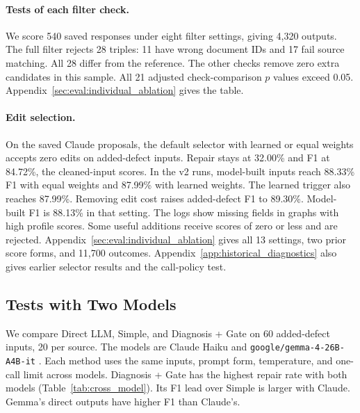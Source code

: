 \paragraph{Tests of each filter check.}
We score 540 saved responses under eight filter settings, giving 4,320
outputs. The full filter rejects 28 triples: 11 have wrong document IDs
and 17 fail source matching. All 28 differ from the reference.
The other checks remove zero extra candidates in this sample.
All 21 adjusted check-comparison $p$ values exceed 0.05.
Appendix~\ref{sec:eval:individual_ablation} gives the table.

\paragraph{Edit selection.}
On the saved Claude proposals, the default selector with learned or equal
weights accepts zero edits on added-defect inputs. Repair stays at 32.00\%
and F1 at 84.72\%, the cleaned-input scores.
In the v2 runs, model-built inputs reach 88.33\% F1 with equal weights
and 87.99\% with learned weights. The learned trigger also reaches 87.99\%.
Removing edit cost raises added-defect F1 to 89.30\%.
Model-built F1 is 88.13\% in that setting.
The logs show missing fields in graphs with high profile scores.
Some useful additions receive scores of zero or less and are rejected.
Appendix~\ref{sec:eval:individual_ablation} gives all 13 settings, two prior
score forms, and 11,700 outcomes. Appendix~\ref{app:historical_diagnostics}
also gives earlier selector results and the call-policy test.

\subsection{Tests with Two Models}
\label{sec:eval:crossmodel}

We compare Direct LLM, Simple, and Diagnosis + Gate on 60 added-defect
inputs, 20 per source. The models are Claude Haiku and
\texttt{google/gemma-4-26B-A4B-it} \citep{ref_gemma4}.
Each method uses the same inputs, prompt form, temperature, and one-call
limit across models. Diagnosis + Gate has the highest repair rate with
both models (Table~\ref{tab:cross_model}). Its F1 lead over Simple is larger
with Claude. Gemma's direct outputs have higher F1 than Claude's.

